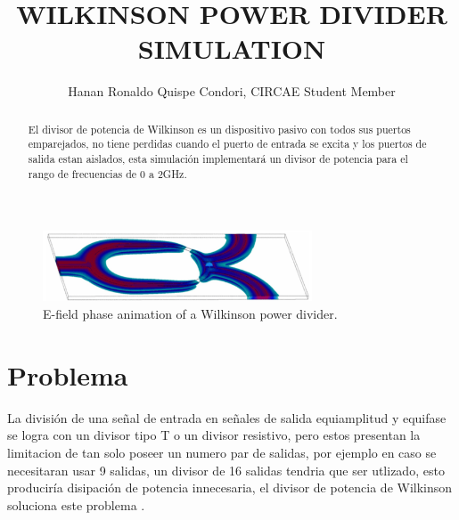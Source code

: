 \documentclass[a4paper]{IEEEtran} %
\begin{document}
\title{WILKINSON POWER DIVIDER SIMULATION}
\author{Hanan Ronaldo Quispe Condori, CIRCAE Student Member}
\maketitle
\begin{abstract}
El divisor de potencia de Wilkinson es un dispositivo pasivo con todos sus puertos emparejados, no tiene perdidas cuando el puerto de entrada se excita y los puertos de salida estan aislados, esta simulación implementará un divisor de potencia para el rango de frecuencias de 0 a 2GHz.
\end{abstract}
\begin{figure}[h]
    \centering
        \includegraphics[width=8cm]{imagenes/img2}
        \caption{E-field phase animation of a Wilkinson power divider.}
        \label{fig:animation}
\end{figure}
\section{Problema}
\label{sec:Problem}
La división de una señal de entrada en señales de salida equiamplitud y equifase se logra con un divisor tipo T o un divisor resistivo, pero estos presentan la limitacion de tan solo poseer un numero par de salidas, por ejemplo en caso se necesitaran usar 9 salidas, un divisor de 16 salidas tendria que ser utlizado, esto produciría disipación de potencia innecesaria, el divisor de potencia de Wilkinson soluciona este problema \cite{wilkinson1960n}.
\end{document}
